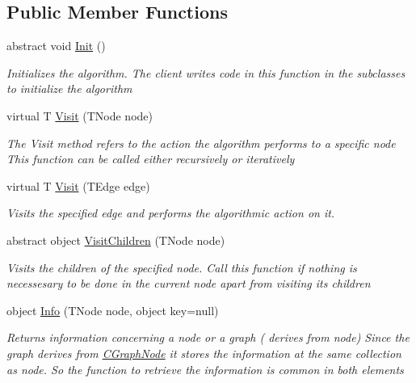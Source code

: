 \subsection*{Public Member Functions}
\begin{DoxyCompactItemize}
\item 
abstract void \hyperlink{class_graph_library_1_1_generics_1_1_abstract_graph_algorithm_a0e98ca6c259123c6975b20857c4af7be}{Init} ()
\begin{DoxyCompactList}\small\item\em Initializes the algorithm. The client writes code in this function in the subclasses to initialize the algorithm \end{DoxyCompactList}\item 
virtual T \hyperlink{class_graph_library_1_1_generics_1_1_abstract_graph_algorithm_a08ce42bc60d311959bc5d1293d3c63da}{Visit} (T\+Node node)
\begin{DoxyCompactList}\small\item\em The Visit method refers to the action the algorithm performs to a specific node This function can be called either recursively or iteratively \end{DoxyCompactList}\item 
virtual T \hyperlink{class_graph_library_1_1_generics_1_1_abstract_graph_algorithm_ad40868c545ebd337122c84f02238b2db}{Visit} (T\+Edge edge)
\begin{DoxyCompactList}\small\item\em Visits the specified edge and performs the algorithmic action on it. \end{DoxyCompactList}\item 
abstract object \hyperlink{class_graph_library_1_1_generics_1_1_abstract_graph_algorithm_afe8f7c1f5bf5085b31a59139d6034eba}{Visit\+Children} (T\+Node node)
\begin{DoxyCompactList}\small\item\em Visits the children of the specified node. Call this function if nothing is necessesary to be done in the current node apart from visiting its children \end{DoxyCompactList}\item 
object \hyperlink{class_graph_library_1_1_generics_1_1_abstract_graph_algorithm_a229680ade697cc543951b56f2d7857b2}{Info} (T\+Node node, object key=null)
\begin{DoxyCompactList}\small\item\em Returns information concerning a node or a graph ( derives from node) Since the graph derives from \hyperlink{class_graph_library_1_1_c_graph_node}{C\+Graph\+Node} it stores the information at the same collection as node. So the function to retrieve the information is common in both elements \end{DoxyCompactList}\item 

\end{DoxyCompactItemize}
